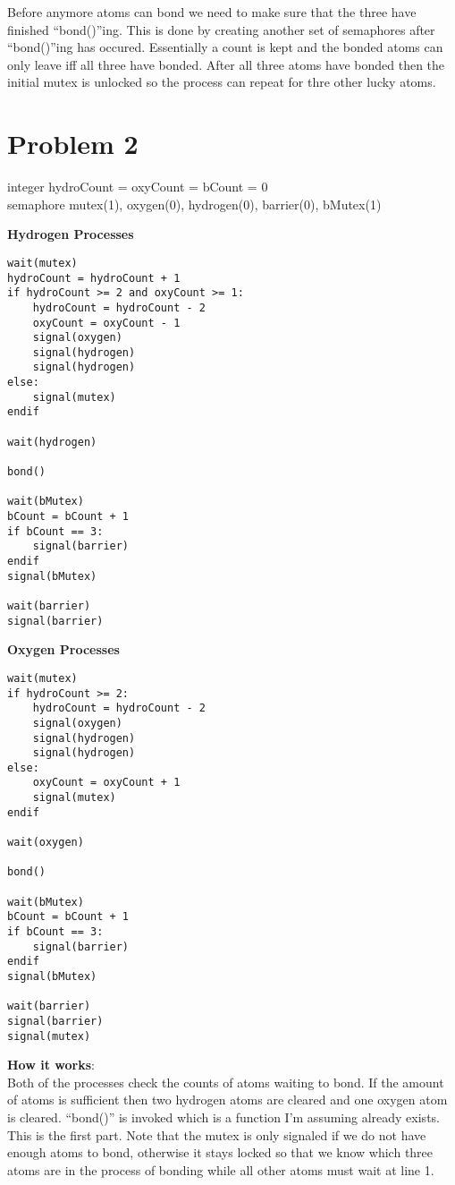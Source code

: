 \documentclass[]{article}
\begin{document}
Before anymore atoms can bond we need to make sure that the three have finished "`bond()"'ing. This is
done by creating another set of semaphores after "`bond()"'ing has occured. Essentially a count is kept
and the bonded atoms can only leave iff all three have bonded. After all three atoms have bonded then
the initial mutex is unlocked so the process can repeat for thre other lucky atoms.
\newpage

\section*{Problem 2}
integer hydroCount = oxyCount = bCount = 0 \\
semaphore mutex(1), oxygen(0), hydrogen(0), barrier(0), bMutex(1)
\begin{multicols}{2}
\textbf{Hydrogen Processes}
\begin{verbatim}
wait(mutex)
hydroCount = hydroCount + 1
if hydroCount >= 2 and oxyCount >= 1:
    hydroCount = hydroCount - 2
    oxyCount = oxyCount - 1
    signal(oxygen)
    signal(hydrogen)
    signal(hydrogen)
else:
    signal(mutex)
endif

wait(hydrogen)

bond()

wait(bMutex)
bCount = bCount + 1
if bCount == 3:
    signal(barrier)
endif
signal(bMutex)

wait(barrier)
signal(barrier)
\end{verbatim}

\textbf{Oxygen Processes}
\begin{verbatim}
wait(mutex)
if hydroCount >= 2:
    hydroCount = hydroCount - 2
    signal(oxygen)
    signal(hydrogen)
    signal(hydrogen)
else:
    oxyCount = oxyCount + 1
    signal(mutex)
endif

wait(oxygen)

bond()

wait(bMutex)
bCount = bCount + 1
if bCount == 3:
    signal(barrier)
endif
signal(bMutex)

wait(barrier)
signal(barrier)
signal(mutex)
\end{verbatim}
\end{multicols}

\textbf{How it works}: \\
Both of the processes check the counts of atoms waiting to bond. If the amount of atoms is sufficient 
then two hydrogen atoms are cleared and one oxygen atom is cleared. "`bond()"' is invoked which is a 
function I'm assuming already exists. This is the first part. Note that the mutex is only signaled
if we do not have enough atoms to bond, otherwise it stays locked so that we know which three atoms
are in the process of bonding while all other atoms must wait at line 1.\\
\end{document}
